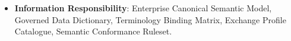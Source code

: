 \begin{itemize}
\begin{itemize}
\begin{itemize}
\item
\emph{Exposed Service}: \texttt{} — Validates representations for compliance.



\end{itemize}


\end{itemize}


\item
\textbf{Information Responsibility}: Enterprise Canonical Semantic Model, Governed Data Dictionary, Terminology Binding Matrix, Exchange Profile Catalogue, Semantic Conformance Ruleset.



\end{itemize}
